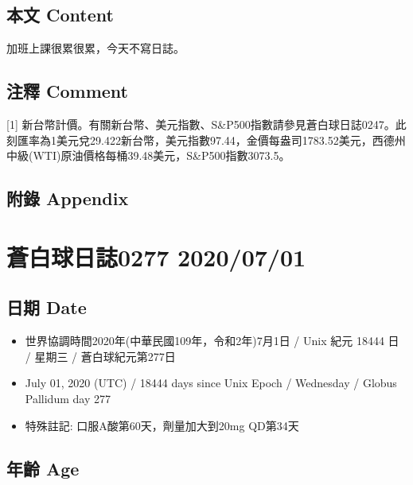 \documentclass[a5paper, 11pt
]{book}
\providecommand{\tightlist}{%
  \setlength{\itemsep}{0pt}\setlength{\parskip}{0pt}}
\begin{document}
\hypertarget{ux672cux6587-content-25}{%
\subsection{本文 Content}\label{ux672cux6587-content-25}}

加班上課很累很累，今天不寫日誌。

\hypertarget{ux6ce8ux91cb-comment-25}{%
\subsection{注釋 Comment}\label{ux6ce8ux91cb-comment-25}}

{[}1{]}
新台幣計價。有關新台幣、美元指數、S\&P500指數請參見蒼白球日誌0247。此刻匯率為1美元兌29.422新台幣，美元指數97.44，金價每盎司1783.52美元，西德州中級(WTI)原油價格每桶39.48美元，S\&P500指數3073.5。

\hypertarget{ux9644ux9304-appendix-25}{%
\subsection{附錄 Appendix}\label{ux9644ux9304-appendix-25}}

\hypertarget{ux84bcux767dux7403ux65e5ux8a8c0277-20200701}{%
\section{蒼白球日誌0277
2020/07/01}\label{ux84bcux767dux7403ux65e5ux8a8c0277-20200701}}

\hypertarget{ux65e5ux671f-date-26}{%
\subsection{日期 Date}\label{ux65e5ux671f-date-26}}

\begin{itemize}
\tightlist
\item
  世界協調時間2020年(中華民國109年，令和2年)7月1日 / Unix 紀元 18444 日
  / 星期三 / 蒼白球紀元第277日
\item
  July 01, 2020 (UTC) / 18444 days since Unix Epoch / Wednesday / Globus
  Pallidum day 277
\item
  特殊註記: 口服A酸第60天，劑量加大到20mg QD第34天
\end{itemize}

\hypertarget{ux5e74ux9f61-age-26}{%
\subsection{年齡 Age}\label{ux5e74ux9f61-age-26}}
\end{document}

